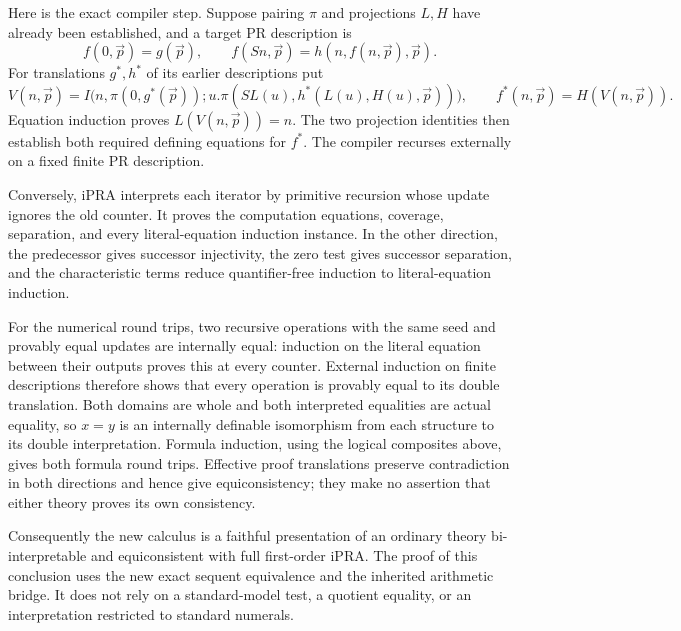 Here is the exact compiler step.  Suppose pairing $\pi$ and projections
$L,H$ have already been established, and a target PR description is
\[
 f(0,\vec p)=g(\vec p),\qquad
 f(Sn,\vec p)=h(n,f(n,\vec p),\vec p).
\]
For translations $g^*,h^*$ of its earlier descriptions put
\[
 V(n,\vec p)=I\bigl(n,\pi(0,g^*(\vec p));
 u.\pi(SL(u),h^*(L(u),H(u),\vec p))\bigr),
 \qquad f^*(n,\vec p)=H(V(n,\vec p)).
\]
Equation induction proves $L(V(n,\vec p))=n$.  The two projection
identities then establish both required defining equations for $f^*$.
The compiler recurses externally on a fixed finite PR description.

Conversely, iPRA interprets each iterator by primitive recursion whose
update ignores the old counter.  It proves the computation equations,
coverage, separation, and every literal-equation induction instance.
In the other direction, the predecessor gives successor injectivity,
the zero test gives successor separation, and the characteristic terms
reduce quantifier-free induction to literal-equation induction.

For the numerical round trips, two recursive operations with the same
seed and provably equal updates are internally equal: induction on the
literal equation between their outputs proves this at every counter.
External induction on finite descriptions therefore shows that every
operation is provably equal to its double translation.  Both domains
are whole and both interpreted equalities are actual equality, so
$x=y$ is an internally definable isomorphism from each structure to its
double interpretation.  Formula induction, using the logical composites
above, gives both formula round trips.  Effective proof translations
preserve contradiction in both directions and hence give
equiconsistency; they make no assertion that either theory proves its
own consistency.

Consequently the new calculus is a faithful presentation of an ordinary
theory bi-interpretable and equiconsistent with full first-order iPRA.
The proof of this conclusion uses the new exact sequent equivalence and
the inherited arithmetic bridge.  It does not rely on a standard-model
test, a quotient equality, or an interpretation restricted to standard
numerals.
